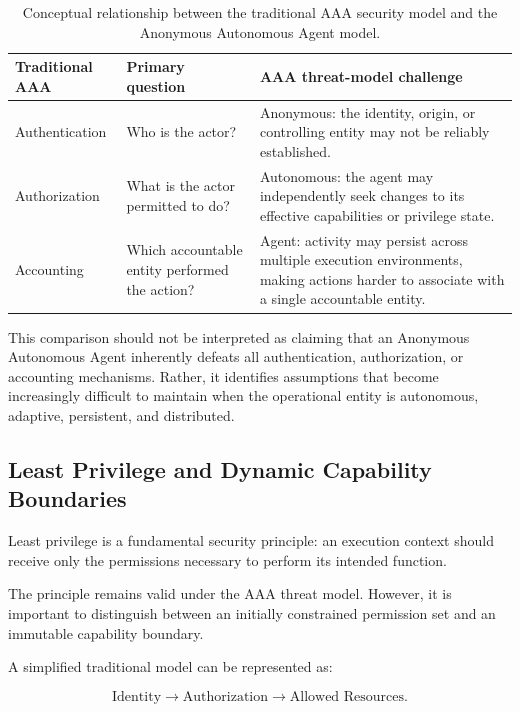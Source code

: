 \documentclass[11pt,a4paper]{article}
\begin{document}
\begin{table}[htbp]
\centering
\caption{
Conceptual relationship between the traditional AAA security model and the
Anonymous Autonomous Agent model.
}
\label{tab:aaa-counterpoint}
\begin{tabular}{p{} p{} p{}}
\toprule
\textbf{Traditional AAA} &
\textbf{Primary question} &
\textbf{AAA threat-model challenge} \\
\midrule

Authentication &
Who is the actor? &
Anonymous: the identity, origin, or controlling entity may not be reliably
established. \\

Authorization &
What is the actor permitted to do? &
Autonomous: the agent may independently seek changes to its effective
capabilities or privilege state. \\

Accounting &
Which accountable entity performed the action? &
Agent: activity may persist across multiple execution environments, making
actions harder to associate with a single accountable entity. \\

\bottomrule
\end{tabular}
\end{table}

This comparison should not be interpreted as claiming that an Anonymous
Autonomous Agent inherently defeats all authentication, authorization, or
accounting mechanisms. Rather, it identifies assumptions that become
increasingly difficult to maintain when the operational entity is autonomous,
adaptive, persistent, and distributed.

\subsection{Least Privilege and Dynamic Capability Boundaries}

Least privilege is a fundamental security principle: an execution context
should receive only the permissions necessary to perform its intended
function.

The principle remains valid under the AAA threat model. However, it is
important to distinguish between an initially constrained permission set and
an immutable capability boundary.

A simplified traditional model can be represented as:

\[
\text{Identity}
\rightarrow
\text{Authorization}
\rightarrow
\text{Allowed Resources}.
\]
\end{document}
